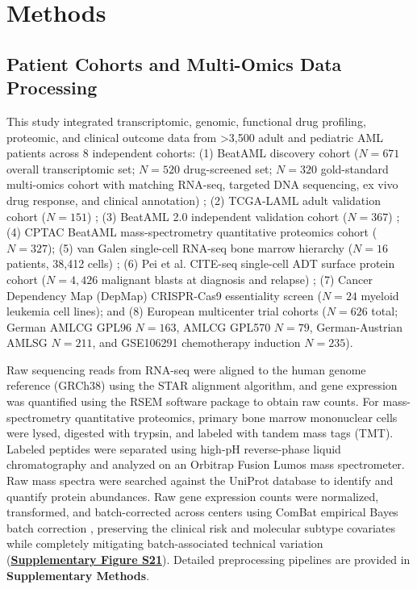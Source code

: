 \documentclass[11pt,a4paper]{article}
\begin{document}
\section{Methods}
\subsection{Patient Cohorts and Multi-Omics Data Processing}
This study integrated transcriptomic, genomic, functional drug profiling, proteomic, and clinical outcome data from >3,500 adult and pediatric AML patients across 8 independent cohorts: (1) BeatAML discovery cohort ($N=671$ overall transcriptomic set; $N=520$ drug-screened set; $N=320$ gold-standard multi-omics cohort with matching RNA-seq, targeted DNA sequencing, ex vivo drug response, and clinical annotation) \cite{tyner2018beataml}; (2) TCGA-LAML adult validation cohort ($N=151$) \cite{cancer2013tcga}; (3) BeatAML 2.0 independent validation cohort ($N=367$) \cite{bottomly2022,bottomly2022beataml}; (4) CPTAC BeatAML mass-spectrometry quantitative proteomics cohort ($N=327$); (5) van Galen single-cell RNA-seq bone marrow hierarchy ($N=16$ patients, 38,412 cells) \cite{vangalen2019single}; (6) Pei et al. CITE-seq single-cell ADT surface protein cohort ($N=4,426$ malignant blasts at diagnosis and relapse) \cite{pei2020monocytic}; (7) Cancer Dependency Map (DepMap) CRISPR-Cas9 essentiality screen ($N=24$ myeloid leukemia cell lines); and (8) European multicenter trial cohorts ($N=626$ total; German AMLCG GPL96 $N=163$, AMLCG GPL570 $N=79$, German-Austrian AMLSG $N=211$, and GSE106291 chemotherapy induction $N=235$).

Raw sequencing reads from RNA-seq were aligned to the human genome reference (GRCh38) using the STAR alignment algorithm, and gene expression was quantified using the RSEM software package to obtain raw counts. For mass-spectrometry quantitative proteomics, primary bone marrow mononuclear cells were lysed, digested with trypsin, and labeled with tandem mass tags (TMT). Labeled peptides were separated using high-pH reverse-phase liquid chromatography and analyzed on an Orbitrap Fusion Lumos mass spectrometer. Raw mass spectra were searched against the UniProt database to identify and quantify protein abundances. Raw gene expression counts were normalized, transformed, and batch-corrected across centers using ComBat empirical Bayes batch correction \cite{johnson2007combat}, preserving the clinical risk and molecular subtype covariates while completely mitigating batch-associated technical variation (\textbf{\href{Supplementary_Methods.pdf}{\textbf{Supplementary Figure S21}}}). Detailed preprocessing pipelines are provided in \textbf{Supplementary Methods}.
\end{document}

